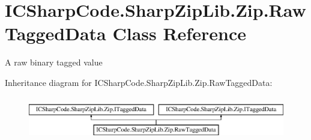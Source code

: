 \hypertarget{class_i_c_sharp_code_1_1_sharp_zip_lib_1_1_zip_1_1_raw_tagged_data}{}\section{I\+C\+Sharp\+Code.\+Sharp\+Zip\+Lib.\+Zip.\+Raw\+Tagged\+Data Class Reference}
\label{class_i_c_sharp_code_1_1_sharp_zip_lib_1_1_zip_1_1_raw_tagged_data}


A raw binary tagged value  


Inheritance diagram for I\+C\+Sharp\+Code.\+Sharp\+Zip\+Lib.\+Zip.\+Raw\+Tagged\+Data\+:\begin{figure}[H]
\begin{center}
\leavevmode
\includegraphics[height=1.937716cm]{class_i_c_sharp_code_1_1_sharp_zip_lib_1_1_zip_1_1_raw_tagged_data}
\end{center}
\end{figure}
